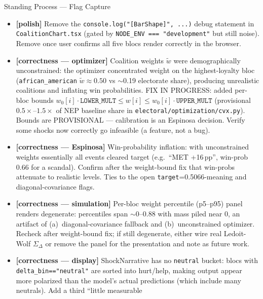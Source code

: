 \documentclass[11pt]{article}
\begin{document}
\begin{taskbox}{Standing Process --- Flag Capture}
{\begin{itemize}[leftmargin=1.6em, itemsep=1pt]
      the translucent weight overlay now render correctly. TypeScript
      type-check and production build both pass. Confirmed in
      \texttt{webapp/components/CoalitionChart.tsx}.
    \item[$\square$] \textbf{[polish]} Remove the \texttt{console.log("[BarShape]", ...)}
      debug statement in \texttt{CoalitionChart.tsx} (gated by
      \texttt{NODE\_ENV === "development"} but still noise). Remove once
      user confirms all five blocs render correctly in the browser.
    \item[$\square$] \textbf{[correctness --- optimizer]} Coalition weights
      $\tilde{w}$ were demographically unconstrained: the optimizer
      concentrated weight on the highest-loyalty bloc
      (\texttt{african\_american} $\tilde{w}\approx0.50$ vs
      $\sim$0.19 electorate share), producing unrealistic coalitions and
      inflating win probabilities. FIX IN PROGRESS: added per-bloc bounds
      $w_0[i]\!\cdot\!\texttt{LOWER\_MULT} \le w[i] \le
      w_0[i]\!\cdot\!\texttt{UPPER\_MULT}$ (provisional
      $0.5\times$--$1.5\times$ of NEP baseline share in
      \texttt{electoral/optimization/cvx.py}). Bounds are PROVISIONAL ---
      calibration is an Espinosa decision. Verify some shocks now
      correctly go infeasible (a feature, not a bug).
    \item[$\square$] \textbf{[correctness --- Espinosa]} Win-probability
      inflation: with unconstrained weights essentially all events cleared
      target (e.g.\ ``MET +16\,pp'', win-prob 0.66 for a scandal). Confirm
      after the weight-bound fix that win-probs attenuate to realistic
      levels. Ties to the open \texttt{target}=0.5066-meaning and
      diagonal-covariance flags.
    \item[$\square$] \textbf{[correctness --- simulation]} Per-bloc weight
      percentile (p5--p95) panel renders degenerate: percentiles span
      $\sim$0--0.88 with mass piled near 0, an artifact of
      (a)~diagonal-covariance fallback and (b)~unconstrained optimizer.
      Recheck after weight-bound fix; if still degenerate, either wire
      real Ledoit-Wolf $\Sigma_\Delta$ or remove the panel for the
      presentation and note as future work.
    \item[$\square$] \textbf{[correctness --- display]} ShockNarrative has
      no \texttt{neutral} bucket: blocs with
      \texttt{delta\_bin=="neutral"} are sorted into hurt/help, making
      output appear more polarized than the model's actual predictions
      (which include many neutrals). Add a third ``little measurable

\end{itemize}}
\end{taskbox}
\end{document}
